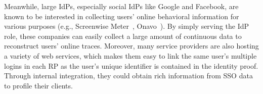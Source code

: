 




Meanwhile, large IdPs, especially social IdPs like Google and Facebook, are known to be interested in collecting users' online behavioral information for various purposes (e.g., Screenwise Meter~\cite{googlenews}, Onavo~\cite{Onavo}). By simply serving the IdP role, these companies can easily collect a large amount of continuous data to reconstruct users' online traces. %
Moreover, many service providers are also hosting a variety of web services, which makes them easy to link the same user's multiple logins in each RP as the user's unique  identifier is contained in the identity proof. Through internal integration, they could obtain rich information from SSO data to profile their clients.



